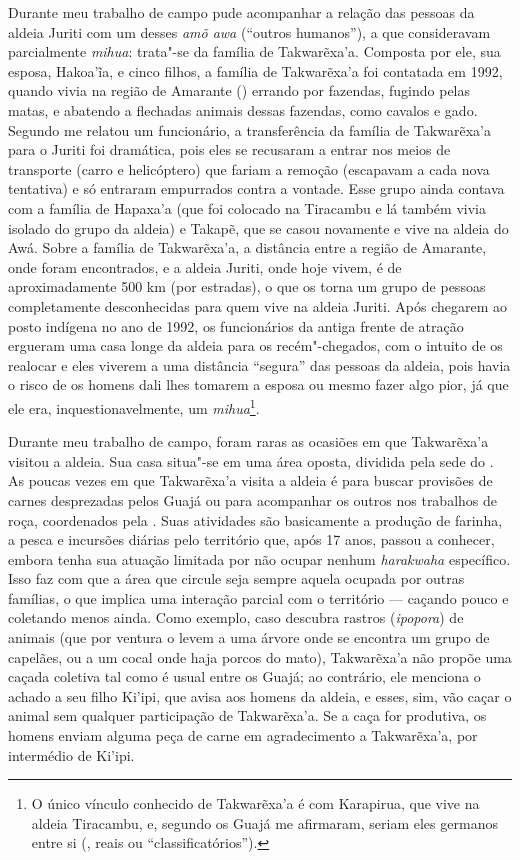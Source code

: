 Durante meu trabalho de campo pude acompanhar a relação das pessoas da
aldeia Juriti com um desses \emph{amõ awa} (``outros humanos''), a que
consideravam parcialmente \emph{mihua}: trata"-se da família de
Takwarẽxa'a. Composta por ele, sua esposa, Hakoa'ĩa, e cinco filhos, a
família de Takwarẽxa'a foi contatada em 1992, quando vivia na região de
Amarante () errando por fazendas, fugindo pelas matas, e abatendo a
flechadas animais dessas fazendas, como cavalos e gado. Segundo me
relatou um funcionário, a transferência da família de Takwarẽxa'a para o
 Juriti foi dramática, pois eles se recusaram a entrar nos meios de
transporte (carro e helicóptero) que fariam a remoção (escapavam a cada
nova tentativa) e só entraram empurrados contra a vontade. Esse grupo
ainda contava com a família de Hapaxa'a (que foi colocado na Tiracambu e
lá também vivia isolado do grupo da aldeia) e Takapẽ, que se casou
novamente e vive na aldeia do  Awá. Sobre a família de Takwarẽxa'a, a
distância entre a região de Amarante, onde foram encontrados, e a aldeia
Juriti, onde hoje vivem, é de aproximadamente 500 km (por estradas), o
que os torna um grupo de pessoas completamente desconhecidas para quem
vive na aldeia Juriti. Após chegarem ao posto indígena no ano de 1992,
os funcionários da antiga frente de atração ergueram uma casa longe da
aldeia para os recém"-chegados, com o intuito de os realocar e eles
viverem a uma distância ``segura'' das pessoas da aldeia, pois havia o
risco de os homens dali lhes tomarem a esposa ou mesmo fazer algo pior,
já que ele era, inquestionavelmente, um \emph{mihua}\footnote{O único
  vínculo conhecido de Takwarẽxa'a é com Karapirua, que vive na aldeia
  Tiracambu, e, segundo os Guajá me afirmaram, seriam eles germanos
  entre si (,  reais ou ``classificatórios'').}.

Durante meu trabalho de campo, foram raras as ocasiões em que
Takwarẽxa'a visitou a aldeia. Sua casa situa"-se em uma área oposta,
dividida pela sede do . As poucas vezes em que Takwarẽxa'a visita a
aldeia é para buscar provisões de carnes desprezadas pelos Guajá ou para
acompanhar os outros nos trabalhos de roça, coordenados pela . Suas
atividades são basicamente a produção de farinha, a pesca e incursões
diárias pelo território que, após 17 anos, passou a conhecer, embora
tenha sua atuação limitada por não ocupar nenhum \emph{harakwaha}
específico. Isso faz com que a área que circule seja sempre aquela
ocupada por outras famílias, o que implica uma interação parcial com o
território --- caçando pouco e coletando menos ainda. Como exemplo, caso
descubra rastros (\emph{ipopora}) de animais (que por ventura o levem a
uma árvore onde se encontra um grupo de capelães, ou a um cocal onde
haja porcos do mato), Takwarẽxa'a não propõe uma caçada coletiva tal
como é usual entre os Guajá; ao contrário, ele menciona o achado a seu
filho Ki'ipi, que avisa aos homens da aldeia, e esses, sim, vão caçar o
animal sem qualquer participação de Takwarẽxa'a. Se a caça for
produtiva, os homens enviam alguma peça de carne em agradecimento a
Takwarẽxa'a, por intermédio de Ki'ipi.

